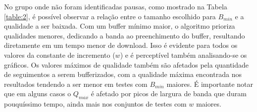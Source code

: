 \documentclass[10pt,twocolumn,letterpaper]{article}
\begin{document}
	No grupo onde não foram identificadas pausas, como 	mostrado na Tabela \ref{table:2}, é possível observar a relação entre o tamanho escolhido para $B_{min}$ e a qualidade a ser baixada. Com um buffer mínimo maior, o algoritmo prioriza qualidades menores, dedicando a banda ao preenchimento do buffer, resultando diretamente em um tempo menor de download. Isso é evidente para todos os valores da constante de incremento ($w$) e é perceptível também analisando-se os gráficos. Os valores máximos de qualidade também são afetados pela quantidade de seguimentos a serem bufferizados, com a qualidade máxima encontrada nos resultados tendendo a ser menor em testes com $B_{min}$ maiores. É importante notar que em alguns casos o $Q_{max}$ é afetado por picos de largura de banda que duram pouquíssimo tempo, ainda mais nos conjuntos de testes com $w$ maiores. 
	
\end{document}
